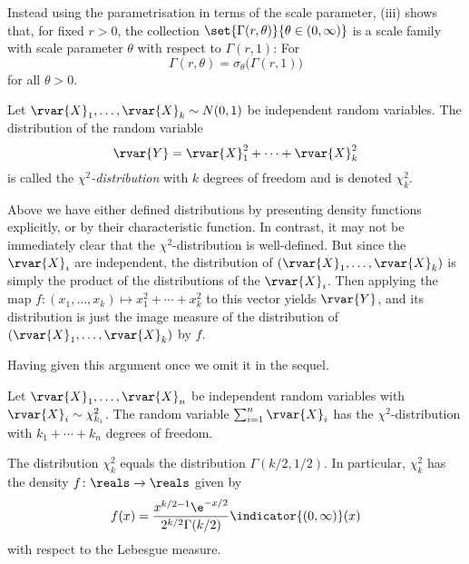 \documentclass[article, a4paper, 11pt, oneside]{memoir}
\numberwithin{equation}{chapter}
\begin{document}
Instead using the parametrisation in terms of the scale parameter, (iii) shows that, for fixed $r > 0$, the collection $\set{ \Gamma(r,\theta) }{ \theta \in (0,\infty) }$ is a scale family with scale parameter $\theta$ with respect to $\Gamma(r,1)$: For
%
\begin{equation*}
    \Gamma(r,\theta)
        = \sigma_\theta \bigl( \Gamma(r,1) \bigr)
\end{equation*}
%
for all $\theta > 0$.


\begin{definition}
    Let $\rvar{X}_1, \ldots, \rvar{X}_k \sim N(0,1)$ be independent random variables. The distribution of the random variable
    \begin{equation*}
        \rvar{Y}
            = \rvar{X}_1^2 + \cdots + \rvar{X}_k^2
    \end{equation*}
    is called the \emph{$\chi^2$-distribution} with $k$ degrees of freedom and is denoted $\chi^2_k$.
\end{definition}
%
Above we have either defined distributions by presenting density functions explicitly, or by their characteristic function. In contrast, it may not be immediately clear that the $\chi^2$-distribution is well-defined. But since the $\rvar{X}_i$ are independent, the distribution of $(\rvar{X}_1, \ldots, \rvar{X}_k)$ is simply the product of the distributions of the $\rvar{X}_i$. Then applying the map $f \colon (x_1, \ldots, x_k) \mapsto x_1^2 + \cdots + x_k^2$ to this vector yields $\rvar{Y}$, and its distribution is just the image measure of the distribution of $(\rvar{X}_1, \ldots, \rvar{X}_k)$ by $f$.

Having given this argument once we omit it in the sequel.


\begin{proposition}
    \begin{enumprop}
        \item Let $\rvar{X}_1, \ldots, \rvar{X}_n$ be independent random variables with $\rvar{X}_i \sim \chi^2_{k_i}$. The random variable $\sum_{i=1}^n \rvar{X}_i$ has the $\chi^2$-distribution with $k_1 + \cdots + k_n$ degrees of freedom.

        \item The distribution $\chi^2_k$ equals the distribution $\Gamma(k/2,1/2)$. In particular, $\chi^2_k$ has the density $f \colon \reals \to \reals$ given by
        \begin{equation*}
            f(x)
                = \frac{ x^{k/2-1} \e^{-x/2} }{2^{k/2} \Gamma(k/2)} \indicator{(0,\infty)}(x)
        \end{equation*}
        with respect to the Lebesgue measure.
    \end{enumprop}
\end{proposition}
\end{document}

